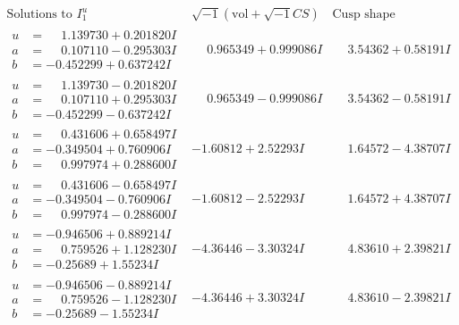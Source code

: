 \documentclass[1p]{elsarticle_modified}
\theoremstyle{definition}
\newcommand{\I}{\sqrt{-1}}
\begin{document}
$$\begin{array}{c|c|c}  
\text{Solutions to }I^u_{1}& \I (\text{vol} + \sqrt{-1}CS) & \text{Cusp shape}\\
 \hline 
\begin{aligned}
u &= \phantom{-}1.139730 + 0.201820 I \\
a &= \phantom{-}0.107110 - 0.295303 I \\
b &= -0.452299 + 0.637242 I\end{aligned}
 & \phantom{-}0.965349 + 0.999086 I & \phantom{-}3.54362 + 0.58191 I \\ \hline\begin{aligned}
u &= \phantom{-}1.139730 - 0.201820 I \\
a &= \phantom{-}0.107110 + 0.295303 I \\
b &= -0.452299 - 0.637242 I\end{aligned}
 & \phantom{-}0.965349 - 0.999086 I & \phantom{-}3.54362 - 0.58191 I \\ \hline\begin{aligned}
u &= \phantom{-}0.431606 + 0.658497 I \\
a &= -0.349504 + 0.760906 I \\
b &= \phantom{-}0.997974 + 0.288600 I\end{aligned}
 & -1.60812 + 2.52293 I & \phantom{-}1.64572 - 4.38707 I \\ \hline\begin{aligned}
u &= \phantom{-}0.431606 - 0.658497 I \\
a &= -0.349504 - 0.760906 I \\
b &= \phantom{-}0.997974 - 0.288600 I\end{aligned}
 & -1.60812 - 2.52293 I & \phantom{-}1.64572 + 4.38707 I \\ \hline\begin{aligned}
u &= -0.946506 + 0.889214 I \\
a &= \phantom{-}0.759526 + 1.128230 I \\
b &= -0.25689 + 1.55234 I\end{aligned}
 & -4.36446 - 3.30324 I & \phantom{-}4.83610 + 2.39821 I \\ \hline\begin{aligned}
u &= -0.946506 - 0.889214 I \\
a &= \phantom{-}0.759526 - 1.128230 I \\
b &= -0.25689 - 1.55234 I\end{aligned}
 & -4.36446 + 3.30324 I & \phantom{-}4.83610 - 2.39821 I \\ \hline\begin{aligned}

\end{aligned}
\end{array}$$
\end{document}
